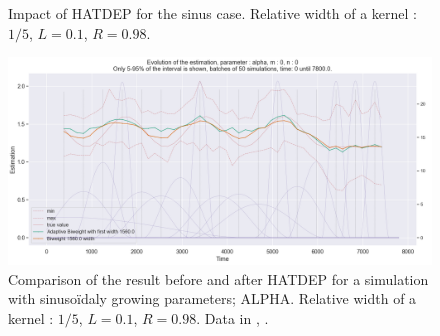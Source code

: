 \begin{figure}
\centering
{} 
\caption{Impact of HATDEP for  the sinus case. Relative width of a kernel : $1/5$, $L = 0.1$, $R = 0.98$.}
\label{fig:compar_kernels_4}
\end{figure}

\begin{figure}
\centering
\includegraphics[width = 0.90 \textwidth]{../imag/chap3/4/M.png}
\caption{Comparison of the result before and after HATDEP for a simulation with sinusoïdaly growing parameters; ALPHA. Relative width of a kernel : $1/5$, $L = 0.1$, $R = 0.98$. Data in \protect {}, \protect {}.}
\label{fig:first_estimate_4_alpha}
\end{figure}

